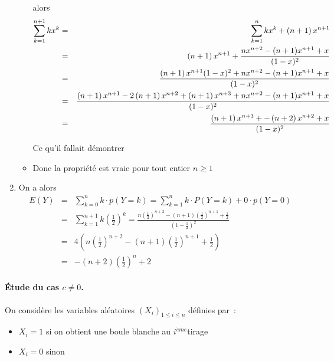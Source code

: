 \documentclass[a4paper, 11pt,reqno]{article}
\begin{document}
\begin{correction}
\begin{enumerate}
\begin{itemize}
alors 
\begin{eqnarray*}
\sum_{k=1}^{n+1}kx^{k} &=&\sum_{k=1}^{n}kx^{k}+\left( n+1\right) x^{n+1} \\
&=&\left( n+1\right) x^{n+1}+\frac{nx^{n+2}-(n+1)x^{n+1}+x}{(1-x)^{2}} \\
&=&\frac{\left( n+1\right) x^{n+1}(1-x)^{2}+nx^{n+2}-(n+1)x^{n+1}+x}{%
(1-x)^{2}} \\
&=&\frac{\left( n+1\right) x^{n+1}-2\left( n+1\right) x^{n+2}+\left(
n+1\right) x^{n+3}+nx^{n+2}-(n+1)x^{n+1}+x}{(1-x)^{2}} \\
&=&\frac{\left( n+1\right) x^{n+3}+-\left( n+2\right) x^{n+2}+x}{(1-x)^{2}}
\end{eqnarray*}

Ce qu'il fallait d\'{e}montrer

\item Donc la propri\'{e}t\'{e} est vraie pour tout entier $n\ge 1$
\end{itemize}

\item On a alors 
\begin{eqnarray*}
E\left( Y\right) &=&\sum_{k=0}^{n}k\cdot p\left( Y=k\right)
=\sum_{k=1}^{n}k\cdot P(Y=k)+0\cdot p\left( Y=0\right) \\
&=&\sum_{k=1}^{n+1}k\left( \frac{1}{2}\right) ^{k}=\frac{n\left( \frac{1}{2}%
\right) ^{n+2}-(n+1)\left( \frac{1}{2}\right) ^{n+1}+\frac{1}{2}}{(1-\frac{1%
}{2})^{2}} \\
&=&4\left( n\left( \frac{1}{2}\right) ^{n+2}-(n+1)\left( \frac{1}{2}\right)
^{n+1}+\frac{1}{2}\right) \\
&=&-\left( n+2\right) \left( \frac{1}{2}\right) ^{n}+2
\end{eqnarray*}
\end{enumerate}

\paragraph{\'Etude du cas $c\neq 0$.}

On consid\`{e}re les variables al\'{e}atoires $\left( X_{i}\right)
_{1\leqslant i\leqslant n}$ d\'{e}finies par~:

\begin{itemize}
\item $X_{i}=1$ si on obtient une boule blanche au $i^{\grave{e}me}$tirage

\item $X_{i}=0$ sinon
\end{itemize}


\end{correction}
\end{document}
